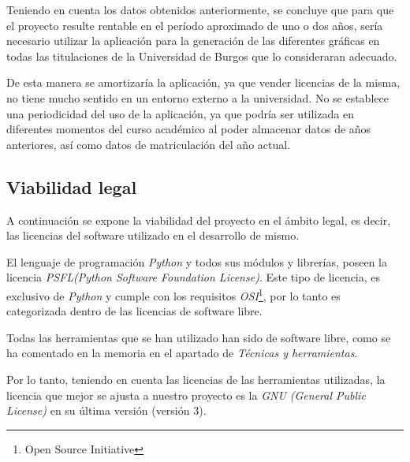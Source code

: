 \begin{itemize}
Teniendo en cuenta los datos obtenidos anteriormente, se concluye que para que el proyecto resulte rentable en el período aproximado de uno o dos años, sería necesario utilizar la aplicación para la generación de las diferentes gráficas en todas las titulaciones de la Universidad de Burgos que lo consideraran adecuado. 

De esta manera se amortizaría la aplicación, ya que vender licencias de la misma, no tiene mucho sentido en un entorno externo a la universidad.
No se establece una periodicidad del uso de la aplicación, ya que podría ser utilizada en diferentes momentos del curso académico al poder almacenar datos de años anteriores, así como datos de matriculación del año actual. 

\end{itemize}

\subsection{Viabilidad legal}

A continuación se expone la viabilidad del proyecto en el ámbito legal, es decir, las licencias del software utilizado en el desarrollo de mismo. 

El lenguaje de programación \emph{Python} y todos sus módulos y librerías, poseen la licencia \emph{PSFL(Python Software Foundation License)}\cite{python}. Este tipo de licencia, es exclusivo de \emph{Python} y cumple con los requisitos \emph{OSI}\footnote{Open Source Initiative}, por lo tanto es categorizada dentro de las licencias de software libre.


Todas las herramientas que se han utilizado han sido de software libre, como se ha comentado en la memoria en el apartado de \emph{Técnicas y herramientas}.


Por lo tanto, teniendo en cuenta las licencias de las herramientas utilizadas, la licencia que mejor se ajusta a nuestro proyecto es la \emph{GNU (General Public License)}\cite{gnu} en su última versión (versión 3).





